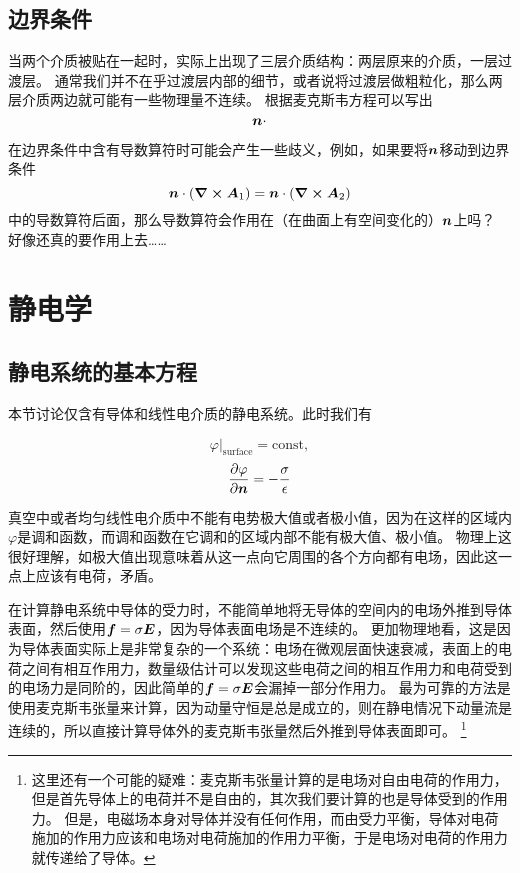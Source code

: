 \documentclass[UTF8, a4paper]{ctexart}
\newcommand*{\const}{\mathrm{const}}
\begin{document}
\subsection{边界条件}

当两个介质被贴在一起时，实际上出现了三层介质结构：两层原来的介质，一层过渡层。
通常我们并不在乎过渡层内部的细节，或者说将过渡层做粗粒化，那么两层介质两边就可能有一些物理量不连续。
根据麦克斯韦方程可以写出
\begin{equation}
    \vb*{n} \cdot 
\end{equation}

在边界条件中含有导数算符时可能会产生一些歧义，例如，如果要将$\vb*{n}$移动到边界条件
\[
    \vb*{n} \cdot (\curl{\vb*{A}_1}) = \vb*{n} \cdot (\curl{\vb*{A}_2})
\]
中的导数算符后面，那么导数算符会作用在（在曲面上有空间变化的）$\vb*{n}$上吗？
好像还真的要作用上去……

\section{静电学}

\subsection{静电系统的基本方程}

本节讨论仅含有导体和线性电介质的静电系统。此时我们有

\begin{equation}
    \varphi|_\text{surface} = \const,
\end{equation}
\begin{equation}
    \pdv{\varphi}{\vb*{n}} = - \frac{\sigma}{\epsilon}
\end{equation}

真空中或者均匀线性电介质中不能有电势极大值或者极小值，因为在这样的区域内$\varphi$是调和函数，而调和函数在它调和的区域内部不能有极大值、极小值。
物理上这很好理解，如极大值出现意味着从这一点向它周围的各个方向都有电场，因此这一点上应该有电荷，矛盾。

在计算静电系统中导体的受力时，不能简单地将无导体的空间内的电场外推到导体表面，然后使用$\vb*{f}=\sigma\vb*{E}$，因为导体表面电场是不连续的。
更加物理地看，这是因为导体表面实际上是非常复杂的一个系统：电场在微观层面快速衰减，表面上的电荷之间有相互作用力，数量级估计可以发现这些电荷之间的相互作用力和电荷受到的电场力是同阶的，因此简单的$\vb*{f}=\sigma\vb*{E}$会漏掉一部分作用力。
最为可靠的方法是使用麦克斯韦张量来计算，因为动量守恒是总是成立的，则在静电情况下动量流是连续的，所以直接计算导体外的麦克斯韦张量然后外推到导体表面即可。%
\footnote{
    这里还有一个可能的疑难：麦克斯韦张量计算的是电场对自由电荷的作用力，但是首先导体上的电荷并不是自由的，其次我们要计算的也是导体受到的作用力。
    但是，电磁场本身对导体并没有任何作用，而由受力平衡，导体对电荷施加的作用力应该和电场对电荷施加的作用力平衡，于是电场对电荷的作用力就传递给了导体。
}%
\end{document}
